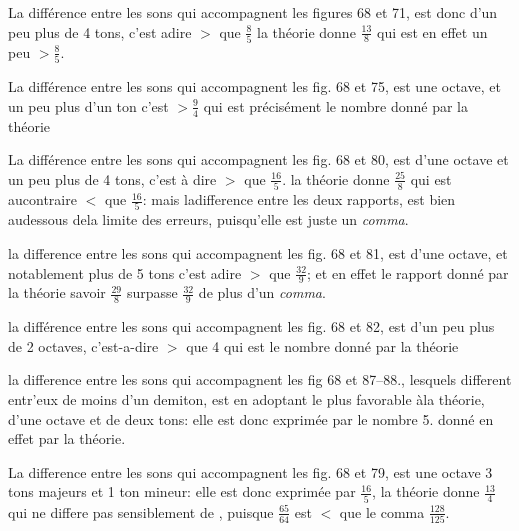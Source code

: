 \documentclass[11pt,a4paper]{article}
\begin{document}

La différence entre les sons qui accompagnent les figures 68 et 71,
est donc d'un peu plus de 4 tons, c'est adire $>$ que $\frac{8}{5}$ la théorie
donne $\frac{13}{8}$ qui est en effet un peu $> \frac{8}{5}$.

La différence entre les sons qui accompagnent les fig. 68 et 75,
est une octave, et un peu plus d'un ton c'est $> \frac{9}{4}$ qui est
précisément le nombre donné par la théorie

La différence entre les sons qui accompagnent les fig. 68 et
80, est d'une octave et un peu plus de 4 tons, c'est à dire
$>$ que $\frac{16}{5}$. la théorie donne $\frac{25}{8}$ qui est aucontraire $<$ que $\frac{16}{5}$:
mais ladifference entre les deux rapports, est bien audessous
dela limite des erreurs, puisqu'elle est juste un \emph{comma}.

la difference entre les sons qui accompagnent les fig. 68 et
81, est d'une octave, et  notablement plus de 5 tons
c'est adire $>$ que $\frac{32}{9}$; et en effet le rapport donné par la
théorie savoir $\frac{29}{8}$ surpasse $\frac{32}{9}$ de plus d'un \emph{comma}.

la différence entre les sons qui accompagnent les fig. 68 et
82, est d'un peu plus de 2 octaves, c'est-a-dire $>$ que 4 qui est
le nombre donné par la théorie

la difference entre les sons qui accompagnent les fig 68 et
87--88., lesquels different entr'eux de moins d'un demiton, est
en adoptant le plus favorable àla théorie, d'une octave
et de deux tons: elle est donc exprimée par le nombre
5. donné en effet par la théorie.


La difference entre les sons qui accompagnent les fig. 68 et
79, est une octave 3 tons majeurs et 1 ton mineur: elle est donc
exprimée par $\frac{16}{5}$, la théorie donne $\frac{13}{4}$ qui ne differe pas
sensiblement de  , puisque $\frac{65}{64}$ est $<$ que le comma
$\frac{128}{125}$.
\end{document}
